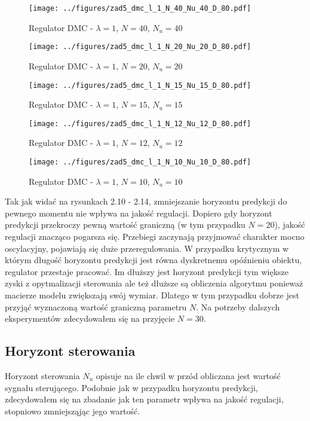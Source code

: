 \documentclass[a4paper,titlepage,11pt,floatssmall]{mwrep}
\begin{document}
\begin{figure}[H]
\centering
\texttt{[image: ../figures/zad5\_dmc\_l\_1\_N\_40\_Nu\_40\_D\_80.pdf]}
\caption{Regulator DMC - $\lambda = 1$, $N = 40$, $N_{u} = 40$}
\end{figure}

\begin{figure}[H]
\centering
\texttt{[image: ../figures/zad5\_dmc\_l\_1\_N\_20\_Nu\_20\_D\_80.pdf]}
\caption{Regulator DMC - $\lambda = 1$, $N = 20$, $N_{u} = 20$}
\end{figure}

\begin{figure}[H]
\centering
\texttt{[image: ../figures/zad5\_dmc\_l\_1\_N\_15\_Nu\_15\_D\_80.pdf]}
\caption{Regulator DMC - $\lambda = 1$, $N = 15$, $N_{u} = 15$}
\end{figure}

\begin{figure}[H]
\centering
\texttt{[image: ../figures/zad5\_dmc\_l\_1\_N\_12\_Nu\_12\_D\_80.pdf]}
\caption{Regulator DMC - $\lambda = 1$, $N = 12$, $N_{u} = 12$}
\end{figure}

\begin{figure}[H]
\centering
\texttt{[image: ../figures/zad5\_dmc\_l\_1\_N\_10\_Nu\_10\_D\_80.pdf]}
\caption{Regulator DMC - $\lambda = 1$, $N = 10$, $N_{u} = 10$}
\end{figure}

Tak jak widać na rysunkach 2.10 - 2.14, zmniejszanie horyzontu predykcji do pewnego momentu nie wpływa na jakość regulacji. Dopiero gdy horyzont predykcji przekroczy pewną wartość graniczną (w tym przypadku $N = 20$), jakość regulacji znacząco pogarsza się. Przebiegi zaczynają przyjmować charakter mocno oscylacyjny, pojawiają się duże przeregulowania. W przypadku krytycznym w którym długość horyzontu predykcji jest równa dyskretnemu opóźnieniu obiektu, regulator przestaje pracować. Im dłuższy jest horyzont predykcji tym większe zyski z opytmalizacji sterowania ale też dłuższe są obliczenia algorytmu ponieważ macierze modelu zwiększają swój wymiar. Dlatego w tym przypadku dobrze jest przyjąć wyznaczoną wartość graniczną parametru $N$. Na potrzeby dalszych eksperymentów zdecydowałem się na przyjęcie $N = 30$. 

\subsection{Horyzont sterowania}
Horyzont sterowania $N_u$ opisuje na ile chwil w przód obliczana jest wartość sygnału sterującego. Podobnie jak w przypadku horyzontu predykcji, zdecydowałem się na zbadanie jak ten parametr wpływa na jakość regulacji, stopniowo zmniejsząjąc jego wartość. 
\end{document}
